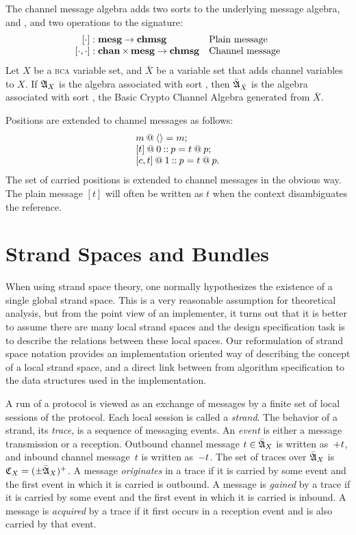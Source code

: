 \documentclass[12pt]{report}
\theoremstyle{definition}
\newcommand{\bca}{\textsc{bca}}
\newcommand{\alga}{\alg{A}}
\newcommand{\algbara}{\bar{\alg{A}}}
\newcommand{\tr}{\ensuremath{\mathfrak C}}
\begin{document}
The channel message algebra adds two sorts to the underlying message
algebra,  and , and two operations to the
signature:
\[\begin{array}{r@{{}:{}}ll}
   [\cdot]&\dom{mesg}\rightarrow\dom{chmsg}&\mbox{Plain message}\\ \relax
   [\cdot,\cdot]&\dom{chan}\times\dom{mesg}\rightarrow\dom{chmsg}
   &\mbox{Channel message}
\end{array}\]
Let $X$ be a {\bca} variable set, and $\bar X$ be a variable set that
adds channel variables to $X$.  If $\alga_X$ is the algebra associated
with sort , then $\algbara_{\bar X}$ is the algebra
associated with sort , the Basic Crypto Channel Algebra
generated from $\bar X$.

Positions are extended to channel messages as follows:
\[\begin{array}{l}
m\mathbin{@}\langle\rangle=m;\\ \relax
[t]\mathbin{@} 0\mathbin{::} p=t\mathbin{@} p;\\ \relax
[c,t]\mathbin{@} 1\mathbin{::} p=t\mathbin{@} p.
\end{array}\]
The set of carried positions is extended to channel messages in the
obvious way.  The plain message $[t]$ will often be written as $t$
when the context disambiguates the reference.

\chapter{Strand Spaces and Bundles}\label{chp:strand spaces and bundles}

When using strand space theory, one normally hypothesizes the
existence of a single global strand space.  This is a very reasonable
assumption for theoretical analysis, but from the point view of an
implementer, it turns out that it is better to assume there are many
local strand spaces and the design specification task is to describe
the relations between these local spaces.  Our reformulation of strand
space notation provides an implementation oriented way of describing
the concept of a local strand space, and a direct link between from
algorithm specification to the data structures used in the
implementation.

A run of a protocol is viewed as an exchange of messages by a finite
set of local sessions of the protocol.  Each local session is called a
\emph{strand}.  The behavior of a strand, its
\emph{trace}, is a sequence of messaging events.  An
\emph{event} is either a message transmission or a
reception.  Outbound channel message $t\in\algbara_X$ is written
as~$\mathord + t$, and inbound channel message~$t$ is written as~$\mathord -
t$.  The set of traces over $\algbara_X$ is $\tr_X=(\pm\algbara_X)^+$.  A
message \emph{originates} in a trace if it is
carried by some event and the first event in which it is carried is
outbound.  A message is \emph{gained} by a trace if it
is carried by some event and the first event in which it is carried is
inbound.  A message is \emph{acquired} by a trace if
it first occurs in a reception event and is also carried by that
event.
\end{document}
